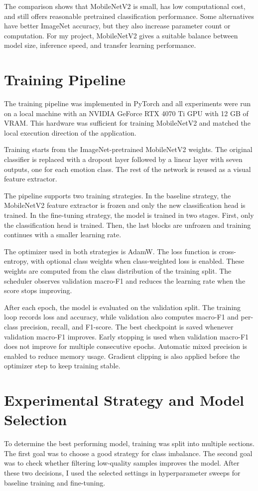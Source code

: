 The comparison shows that MobileNetV2 is small, has low computational cost, and still offers reasonable pretrained classification performance. Some alternatives have better ImageNet accuracy, but they also increase parameter count or computation. For my project, MobileNetV2 gives a suitable balance between model size, inference speed, and transfer learning performance.

\section{Training Pipeline}

The training pipeline was implemented in PyTorch and all experiments were run on a local machine with an NVIDIA GeForce RTX 4070 Ti GPU with 12 GB of VRAM. This hardware was sufficient for training MobileNetV2 and matched the local execution direction of the application.

Training starts from the ImageNet-pretrained MobileNetV2 weights. The original classifier is replaced with a dropout layer followed by a linear layer with seven outputs, one for each emotion class. The rest of the network is reused as a visual feature extractor.

The pipeline supports two training strategies. In the baseline strategy, the MobileNetV2 feature extractor is frozen and only the new classification head is trained. In the fine-tuning strategy, the model is trained in two stages. First, only the classification head is trained. Then, the last blocks are unfrozen and training continues with a smaller learning rate.

The optimizer used in both strategies is AdamW. The loss function is cross-entropy, with optional class weights when class-weighted loss is enabled. These weights are computed from the class distribution of the training split. The scheduler observes validation macro-F1 and reduces the learning rate when the score stops improving.

After each epoch, the model is evaluated on the validation split. The training loop records loss and accuracy, while validation also computes macro-F1 and per-class precision, recall, and F1-score. The best checkpoint is saved whenever validation macro-F1 improves. Early stopping is used when validation macro-F1 does not improve for multiple consecutive epochs. Automatic mixed precision is enabled to reduce memory usage. Gradient clipping is also applied before the optimizer step to keep training stable.

\section{Experimental Strategy and Model Selection}
To determine the best performing model, training was split into multiple sections. The first goal was to choose a good strategy for class imbalance. The second goal was to check whether filtering low-quality samples improves the model. After these two decisions, I used the selected settings in hyperparameter sweeps for baseline training and fine-tuning.

